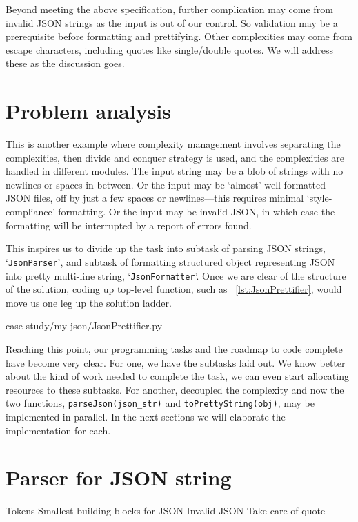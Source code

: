 \documentclass[oneside,11pt]{book}
\theoremstyle{definition}
\theoremstyle{remark}
\newcommand{\code}[1]{\mbox{\lstinline{#1}}}
\begin{document}
Beyond meeting the above specification, further complication may come from invalid JSON strings
as the input is out of our control.
So validation may be a prerequisite before formatting and prettifying.
Other complexities may come from escape characters, including quotes like single/double quotes.
We will address these as the discussion goes.

\section{Problem analysis}\label{sec:outlineOfTheAlgorithm.Json}

This is another example where complexity management involves separating the complexities,
then divide and conquer strategy is used, and the complexities are handled in
different modules.
The input string may be a blob of strings with no newlines or spaces in between.
Or the input may be `almost' well-formatted JSON files, off by just a few spaces or
newlines---this requires minimal `style-compliance' formatting.
Or the input may be invalid JSON, in which case the formatting will be interrupted
by a report of errors found.

This inspires us to divide up the task into subtask of parsing JSON strings,
`\code{JsonParser}', and subtask of formatting
structured object representing JSON into pretty multi-line string, `\code{JsonFormatter}'.
Once we are clear of the structure of the solution, coding up top-level function,
such as ~\autoref{lst:JsonPrettifier}, would
move us one leg up the solution ladder.


{case-study/my-json/JsonPrettifier.py}

Reaching this point, our programming tasks and the roadmap to code complete have become very clear.
For one, we have the subtasks laid out.
We know better about the kind of work needed to complete the task, we can even start allocating
resources to these subtasks.
For another, decoupled the complexity and now the two functions, \code{parseJson(json_str)}
and \code{toPrettyString(obj)}, may be implemented in parallel.
In the next sections we will elaborate the implementation for each.

\section{Parser for JSON string}\label{sec:jsonparser}

Tokens
Smallest building blocks for JSON
Invalid JSON
Take care of quote
\end{document}
